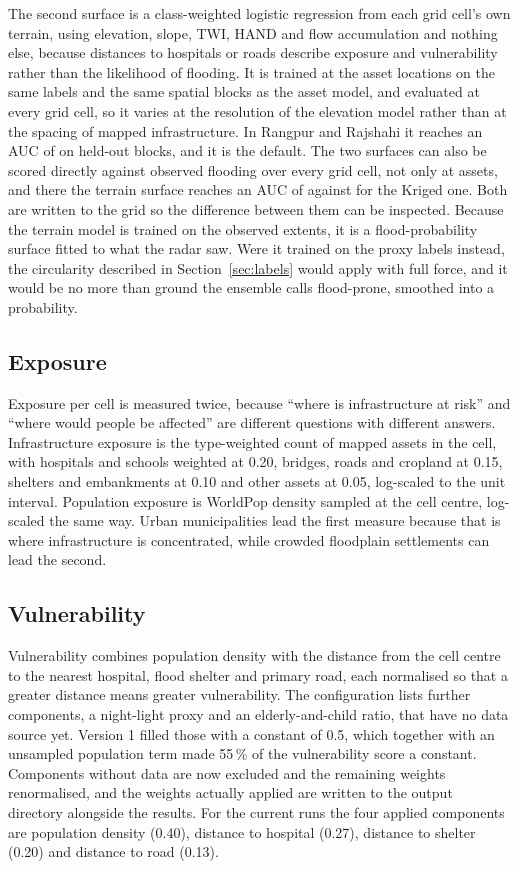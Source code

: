 \documentclass[10pt,a4paper,twocolumn]{article}
\begin{document}
The second surface is a class-weighted logistic regression from each grid cell's own terrain, using elevation, slope, TWI, HAND and flow accumulation and nothing else, because distances to hospitals or roads describe exposure and vulnerability rather than the likelihood of flooding. It is trained at the asset locations on the same labels and the same spatial blocks as the asset model, and evaluated at every grid cell, so it varies at the resolution of the elevation model rather than at the spacing of mapped infrastructure. In Rangpur and Rajshahi it reaches an AUC of \RRHazardAUC{} on held-out blocks, and it is the default. The two surfaces can also be scored directly against observed flooding over every grid cell, not only at assets, and there the terrain surface reaches an AUC of \RRSurfaceTerrainObsAUC{} against \RRSurfaceKrigedObsAUC{} for the Kriged one. Both are written to the grid so the difference between them can be inspected. Because the terrain model is trained on the observed extents, it is a flood-probability surface fitted to what the radar saw. Were it trained on the proxy labels instead, the circularity described in Section~\ref{sec:labels} would apply with full force, and it would be no more than ground the ensemble calls flood-prone, smoothed into a probability.

\subsection{Exposure}

Exposure per cell is measured twice, because ``where is infrastructure at risk'' and ``where would people be affected'' are different questions with different answers. Infrastructure exposure is the type-weighted count of mapped assets in the cell, with hospitals and schools weighted at 0.20, bridges, roads and cropland at 0.15, shelters and embankments at 0.10 and other assets at 0.05, log-scaled to the unit interval. Population exposure is WorldPop density sampled at the cell centre, log-scaled the same way. Urban municipalities lead the first measure because that is where infrastructure is concentrated, while crowded floodplain settlements can lead the second.

\subsection{Vulnerability}

Vulnerability combines population density with the distance from the cell centre to the nearest hospital, flood shelter and primary road, each normalised so that a greater distance means greater vulnerability. The configuration lists further components, a night-light proxy and an elderly-and-child ratio, that have no data source yet. Version 1 filled those with a constant of 0.5, which together with an unsampled population term made 55\,\% of the vulnerability score a constant. Components without data are now excluded and the remaining weights renormalised, and the weights actually applied are written to the output directory alongside the results. For the current runs the four applied components are population density (0.40), distance to hospital (0.27), distance to shelter (0.20) and distance to road (0.13).
\end{document}
